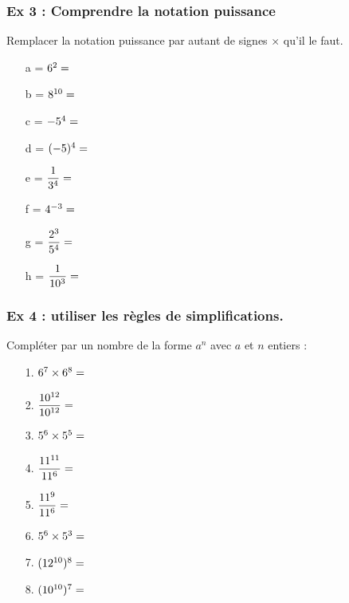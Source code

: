 \documentclass[10pt]{article}
\begin{document}
\subsubsection*{Ex 3 : Comprendre la notation puissance}

Remplacer la notation puissance par autant de signes $\times$ qu'il le faut. 

\begin{multicols}{3}
  \begin{itemize}
  \item[a =] $6^2 =  \dotfill $
  \item[b =] $8^{10} =  \dotfill $
  \item[c =] $-5^4  =  \dotfill $
  \item[d =] $(-5)^{4} =  \dotfill $
  \item[e =] $\dfrac{1}{3^4} =  \dotfill $
  \item[f =] $ 4^{-3} =  \dotfill $
  \item[g =] $ \dfrac{2^3}{5^{4}} =  \dotfill $
  \item[h =] $ \dfrac{1}{10^{3}} =  \dotfill $
  \end{itemize}
\end{multicols}

\subsubsection*{Ex 4 : utiliser les règles de simplifications.}

Compléter par un nombre de la forme $a^n$ avec $a$ et $n$ entiers :

\begin{multicols}{4}
  \begin{enumerate}
  \item[1.] $6^{7}  \times  6^{8}  =  \dotfill$
  \item[2.] $\dfrac{10^{12}}{10^{12}} = \dotfill$
  \item[3.] $5^{6} \times 5^{5} = \dotfill$
  \item[4.] $\dfrac{11^{11}}{11^{6}} = \dotfill$
  \item[5.] $\dfrac{11^{9}}{11^{6}} = \dotfill$
  \item[6.] $5^{6} \times 5^{3} = \dotfill$
  \item[7.] $(12^{10})^{8} = \dotfill$
  \item[8.] $(10^{10})^{7} = \dotfill$
  \end{enumerate}
\end{multicols}
\end{document}
